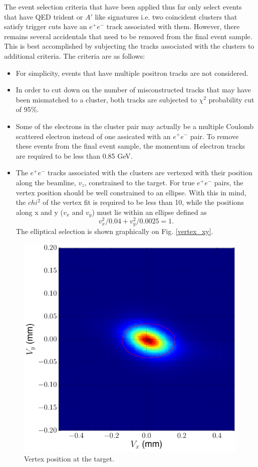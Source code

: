 The event selection criteria that have been applied thus far only select 
events that have QED trident or $A'$ like signatures i.e. two coincident clusters that
satisfy trigger cuts have an $e^+e^-$ track associated with them.  However, 
there remains several accidentals that need to be removed from the final 
event sample.  This is best accomplished by subjecting the tracks associated 
with the clusters to additional criteria.  The criteria are as follows: 
\begin{itemize}
    \item For simplicity, events that have multiple positron tracks are not 
          considered.
    \item In order to cut down on the number of misconstructed tracks that may
          have been mismatched to a cluster, both tracks are subjected to 
          $\chi^2$ probability cut of 95\%.
    \item Some of the electrons in the cluster pair may actually be a multiple
          Coulomb scattered electron instead of one assicated with an $e^+e^-$ 
          pair.  To remove these events from the final event sample, the 
          momentum of electron tracks are required to be less than 0.85 GeV.
    \item The $e^+e^-$ tracks associated with the clusters are vertexed with 
          their position along the beamline, $v_z$, constrained to the target. 
          For true $e^+e^-$ pairs, the vertex position should be well constrained
          to an ellipse.  With this in mind, 
          the $chi^2$ of the vertex fit is required to be less than 10, while
          the positions along x and y ($v_x$ and $v_y$) must lie within an ellipse 
          defined as
          \[
                v_x^2/0.04 + v_y^2/0.0025  = 1.
          \]
          The elliptical selection is shown graphically on Fig. \ref{vertex_xy}.
\end{itemize}
\begin{figure}[t]
    \centering
    \includegraphics[width=.9\textwidth]{images/20160503_vertex_xy.png}
    \caption{Vertex position at the target.}
    \label{fig:vertex_xy}
\end{figure}  
